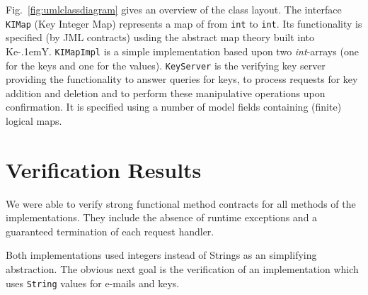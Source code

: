 \documentclass{llncs}
\newcommand{\KeY}{Ke\kern-.1emY\xspace}
\begin{document}
Fig.~\ref{fig:umlclassdiagram} gives an overview of the class layout.
%
The interface \texttt{KIMap} (Key Integer Map) represents a map of
from \texttt{int} to \texttt{int}. Its functionality is specified (by
JML contracts) usding the abstract map theory built into
\KeY. \texttt{KIMapImpl} is a simple implementation based upon two
\emph{int}-arrays (one for the keys and one for the values).
%
\texttt{KeyServer} is the verifying key server
providing the functionality to answer queries for keys, to process
requests for key addition and deletion and to perform these
manipulative operations upon confirmation. It is specified using a
number of model fields containing (finite) logical maps.
%

\section{Verification Results}

We were able to verify strong functional method contracts for all
methods of the implementations. They include the absence of runtime
exceptions and a guaranteed termination of each request handler.



Both implementations used integers instead of Strings as an
simplifying abstraction.
%
The obvious next goal is the verification of an implementation which
uses \texttt{String} values for e-mails and keys.
%
%



\end{document}
